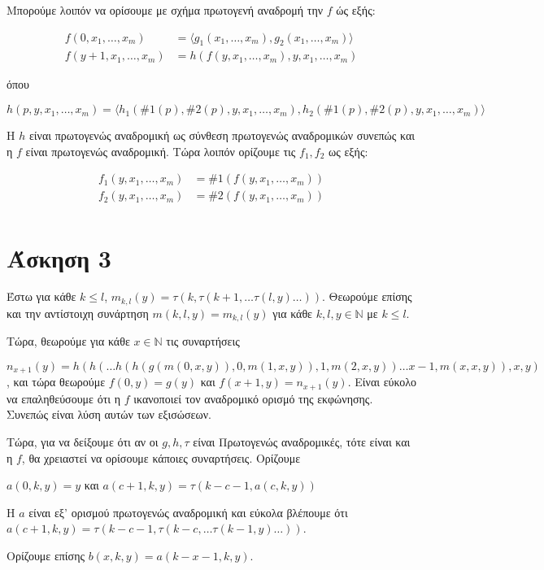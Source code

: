 \documentclass[a4paper, oneside, 11pt]{article}
\theoremstyle{definition}
\begin{document}
Μπορούμε λοιπόν να ορίσουμε με σχήμα πρωτογενή αναδρομή την $f$ ώς εξής:

\begin{align*}
   f(0, x_1, \ldots, x_m) &= \langle g_1(x_1, \ldots, x_m), g_2(x_1, \ldots, x_m)
                             \rangle\\
   f(y+1, x_1, \ldots, x_m) &= h( f(y, x_1, \ldots, x_m), y, x_1, \ldots, x_m)
\end{align*}

όπου

\[ h( p, y, x_1, \ldots, x_m ) = \langle h_1( \#1(p), \#2(p), y, x_1, \ldots,
x_m), h_2(\#1(p), \#2(p), y, x_1, \ldots, x_m) \rangle \]

Η $h$ είναι πρωτογενώς αναδρομική ως σύνθεση πρωτογενώς αναδρομικών συνεπώς και
η $f$ είναι πρωτογενώς αναδρομική. Τώρα λοιπόν ορίζουμε τις $f_1, f_2$ ως εξής:

\begin{align*}
   f_1(y, x_1, \ldots, x_m) &= \#1(f(y, x_1, \ldots, x_m))\\
   f_2(y, x_1, \ldots, x_m) &= \#2(f(y, x_1, \ldots, x_m))\\
\end{align*}

\section*{Άσκηση 3}
Έστω για κάθε $k\leq l$, 
$m_{k,l}(y)=\tau(k,\tau(k+1,\dots\tau(l,y)\dots))$. Θεωρούμε επίσης και την αντίστοιχη συνάρτηση $m(k,l,y)=m_{k,l}(y)$ για κάθε $k,l,y\in \mathbb{N}$ με $k\leq l$.

Τώρα, θεωρούμε για κάθε $x\in \mathbb{N}$ τις συναρτήσεις 

$n_{x+1}(y)=h(h(\dots h(h(g(m(0,x,y)),0,m(1,x,y)),1,m(2,x,y))\dots x-1,m(x,x,y)),x,y)$, και τώρα θεωρούμε
$f(0,y)=g(y)$ και $f(x+1,y)=n_{x+1}(y)$. Είναι εύκολο να επαληθεύσουμε ότι η $f$ ικανοποιεί τον αναδρομικό ορισμό της εκφώνησης. Συνεπώς είναι λύση αυτών των εξισώσεων.

Τώρα, για να δείξουμε ότι αν οι $g, h,\tau$ είναι Πρωτογενώς αναδρομικές, τότε είναι και η $f$, θα χρειαστεί να ορίσουμε κάποιες
συναρτήσεις.
Ορίζουμε

$a(0,k,y)=y$ και $a(c+1,k,y)=\tau(k-c-1,a(c,k,y))$

Η $a$ είναι εξ' ορισμού πρωτογενώς αναδρομική και εύκολα βλέπουμε ότι $a(c+1,k,y)=\tau(k-c-1,\tau(k-c,\dots\tau(k-1,y)\dots))$.

Ορίζουμε επίσης $b(x,k,y)=a(k-x-1,k,y)$. 
\end{document}
